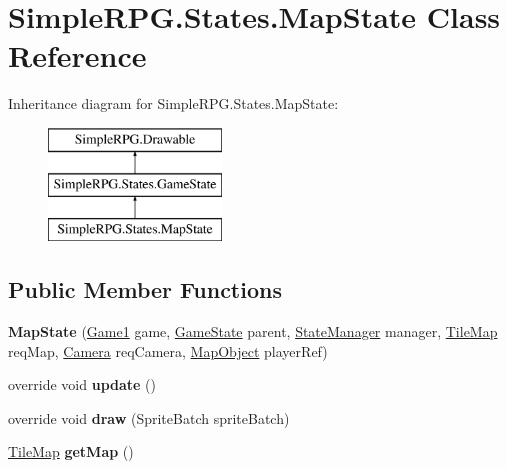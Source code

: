 \hypertarget{class_simple_r_p_g_1_1_states_1_1_map_state}{\section{Simple\-R\-P\-G.\-States.\-Map\-State Class Reference}
\label{class_simple_r_p_g_1_1_states_1_1_map_state}
}
Inheritance diagram for Simple\-R\-P\-G.\-States.\-Map\-State\-:\begin{figure}[H]
\begin{center}
\leavevmode
\includegraphics[height=3.000000cm]{class_simple_r_p_g_1_1_states_1_1_map_state}
\end{center}
\end{figure}
\subsection*{Public Member Functions}
\begin{DoxyCompactItemize}
\item 
\hypertarget{class_simple_r_p_g_1_1_states_1_1_map_state_a50fdccce55137f029299c1f503bc7036}{{\bfseries Map\-State} (\hyperlink{class_simple_r_p_g_1_1_game1}{Game1} game, \hyperlink{class_simple_r_p_g_1_1_states_1_1_game_state}{Game\-State} parent, \hyperlink{class_simple_r_p_g_1_1_states_1_1_state_manager}{State\-Manager} manager, \hyperlink{class_simple_r_p_g_1_1_tile_map}{Tile\-Map} req\-Map, \hyperlink{class_simple_r_p_g_1_1_camera}{Camera} req\-Camera, \hyperlink{class_simple_r_p_g_1_1_map_object}{Map\-Object} player\-Ref)}\label{class_simple_r_p_g_1_1_states_1_1_map_state_a50fdccce55137f029299c1f503bc7036}

\item 
\hypertarget{class_simple_r_p_g_1_1_states_1_1_map_state_a33046184ea7cbf635fa2523705c1b2fb}{override void {\bfseries update} ()}\label{class_simple_r_p_g_1_1_states_1_1_map_state_a33046184ea7cbf635fa2523705c1b2fb}

\item 
\hypertarget{class_simple_r_p_g_1_1_states_1_1_map_state_ad50aff095077e679434d708abb11e716}{override void {\bfseries draw} (Sprite\-Batch sprite\-Batch)}\label{class_simple_r_p_g_1_1_states_1_1_map_state_ad50aff095077e679434d708abb11e716}

\item 
\hypertarget{class_simple_r_p_g_1_1_states_1_1_map_state_a81c53a84503b3443129db20e1683772e}{\hyperlink{class_simple_r_p_g_1_1_tile_map}{Tile\-Map} {\bfseries get\-Map} ()}\label{class_simple_r_p_g_1_1_states_1_1_map_state_a81c53a84503b3443129db20e1683772e}

\end{DoxyCompactItemize}
